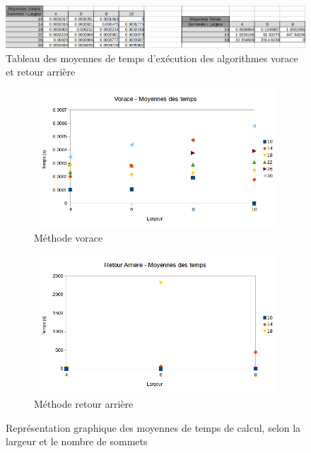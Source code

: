 \documentclass[10pt,a4paper]{article}
\begin{document}
\begin{figure}[h!]
	\centering
	\includegraphics[width=\textwidth]{spreadsheet/temps}
	\caption{Tableau des moyennes de temps d'exécution des algorithmes vorace et retour arrière}
\end{figure} 

\begin{figure}[h!]
	\begin{subfigure}[c]{0.5\textwidth}
		\centering
		\includegraphics[width=\textwidth]{spreadsheet/graph1}
		\caption{Méthode vorace}
	\end{subfigure}
	\begin{subfigure}[c]{0.5\textwidth}
		\centering
		\includegraphics[width=\textwidth]{spreadsheet/graph2}
		\caption{Méthode retour arrière}
	\end{subfigure}
	\caption{Représentation graphique des moyennes de temps de calcul, selon la largeur et le nombre de sommets}
\end{figure}
\end{document}
